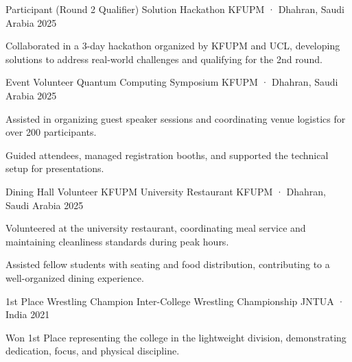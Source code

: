 

\begin{cventries}

  \cventry
    {Participant (Round 2 Qualifier)} %
    {Solution Hackathon} %
    {KFUPM · Dhahran, Saudi Arabia} %
    {2025} %
    {
      \begin{cvitems}
        \item {Collaborated in a 3-day hackathon organized by KFUPM and UCL, developing solutions to address real-world challenges and qualifying for the 2nd round.}
      \end{cvitems}
    }

  \cventry
    {Event Volunteer} %
    {Quantum Computing Symposium} %
    {KFUPM · Dhahran, Saudi Arabia} %
    {2025} %
    {
      \begin{cvitems}
        \item {Assisted in organizing guest speaker sessions and coordinating venue logistics for over 200 participants.}
        \item {Guided attendees, managed registration booths, and supported the technical setup for presentations.}
      \end{cvitems}
    }

  \cventry
    {Dining Hall Volunteer} %
    {KFUPM University Restaurant} %
    {KFUPM · Dhahran, Saudi Arabia} %
    {2025} %
    {
      \begin{cvitems}
        \item {Volunteered at the university restaurant, coordinating meal service and maintaining cleanliness standards during peak hours.}
        \item {Assisted fellow students with seating and food distribution, contributing to a well-organized dining experience.}
      \end{cvitems}
    }

  \cventry
    {1st Place Wrestling Champion} %
    {Inter-College Wrestling Championship} %
    {JNTUA · India} %
    {2021} %
    {
      \begin{cvitems}
        \item {Won 1st Place representing the college in the lightweight division, demonstrating dedication, focus, and physical discipline.}
      \end{cvitems}
    }

\end{cventries}
